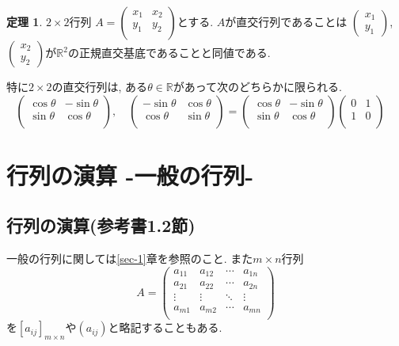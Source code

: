 \documentclass[dvipdfmx,a4paper,11pt]{article}
\newcommand{\R}{\mathbb{R}}
\theoremstyle{definition}
\newtheorem{thm}{定理}
\begin{document}
 
 \begin{tcolorbox}[
    colback = white,
    colframe = green!35!black,
    fonttitle = \bfseries,
    breakable = true]
    \begin{thm}
$2 \times 2$行列
$
A=\begin{pmatrix}
 x_1& x_2 \\
y_1& y_2 \\
\end{pmatrix}
$とする.
$A$が直交行列であることは
$
\begin{pmatrix}
 x_1 \\
y_1
\end{pmatrix}
$,
$
\begin{pmatrix}
 x_2 \\
y_2
\end{pmatrix}
$が$\R^2$の正規直交基底であることと同値である.

 特に$2 \times 2$の直交行列は, ある$\theta \in\R$があって次のどちらかに限られる. 
$$
\begin{pmatrix}
\cos \theta & -\sin \theta\\
\sin \theta& \cos \theta  \\
\end{pmatrix},
\quad
\begin{pmatrix}
 -\sin \theta&\cos \theta \\
\cos \theta & \sin \theta\\
\end{pmatrix}
=
\begin{pmatrix}
\cos \theta & -\sin \theta\\
\sin \theta& \cos \theta  \\
\end{pmatrix}
\begin{pmatrix}
0 & 1\\
1& 0\\
\end{pmatrix}
\quad
$$
\end{thm}
 \end{tcolorbox}
 
 
 
\newpage

\section{行列の演算 -一般の行列-}

\subsection{行列の演算(参考書1.2節)}
一般の行列に関しては\ref{sec-1}章を参照のこと.
また$m \times n$行列
$$
A=\begin{pmatrix}
a_{11}& a_{12} & \cdots &a_{1n} \\
a_{21}& a_{22} & \cdots &a_{2n} \\
\vdots& \vdots	&	\ddots   &	\vdots \\
a_{m1}& a_{m2} & \cdots &a_{mn} \\
\end{pmatrix}
$$
を$[a_{ij}]_{m\times n}$や$(a_{ij})$と略記することもある.
\end{document}
